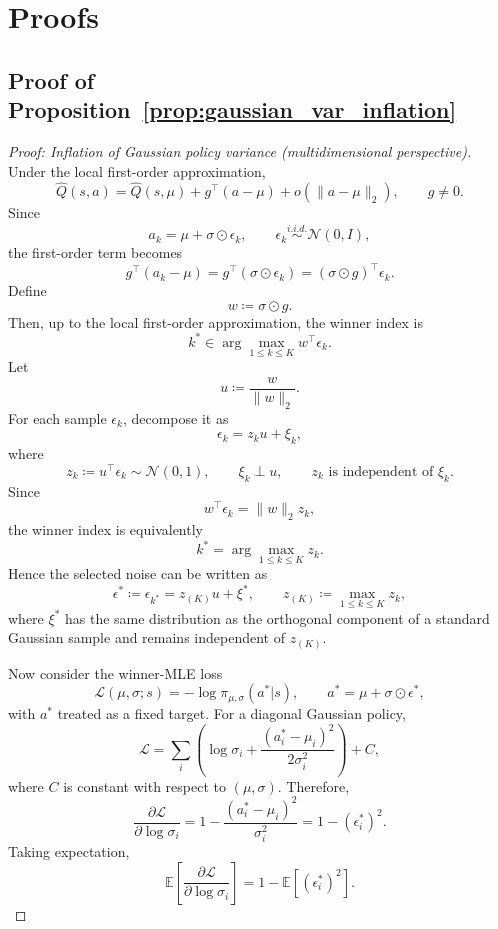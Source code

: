 \section{Proofs}
\subsection{Proof of Proposition~\ref{prop:gaussian_var_inflation}}
\label{app:proof_of_var_inflation_multi_dim}
\begin{proof}[Proof: Inflation of Gaussian policy variance (multidimensional perspective)]

Under the local first-order approximation,
\[
\hat Q(s,a)=\hat Q(s,\mu)+g^\top(a-\mu)+o(\|a-\mu\|_2),
\qquad g\neq 0.
\]
Since
\[
a_k=\mu+\sigma\odot \epsilon_k,
\qquad
\epsilon_k\overset{i.i.d.}{\sim}\mathcal N(0,I),
\]
the first-order term becomes
\[
g^\top(a_k-\mu)
=
g^\top(\sigma\odot \epsilon_k)
=
(\sigma\odot g)^\top \epsilon_k.
\]
Define
\[
w\coloneq \sigma\odot g.
\]
Then, up to the local first-order approximation, the winner index is
\[
k^*\in \arg\max_{1\le k\le K} w^\top \epsilon_k.
\]
Let
\[
u\coloneq \frac{w}{\|w\|_2}.
\]
For each sample $\epsilon_k$, decompose it as
\[
\epsilon_k=z_k u+\xi_k,
\]
where
\[
z_k\coloneq u^\top \epsilon_k \sim \mathcal N(0,1),
\qquad
\xi_k \perp u,
\qquad
z_k \text{ is independent of } \xi_k.
\]
Since
\[
w^\top \epsilon_k = \|w\|_2 z_k,
\]
the winner index is equivalently
\[
k^*=\arg\max_{1\le k\le K} z_k.
\]
Hence the selected noise can be written as
\[
\epsilon^* \coloneq \epsilon_{k^*}= z_{(K)}u+\xi^*,
\qquad
z_{(K)}\coloneq \max_{1\le k\le K} z_k,
\]
where $\xi^*$ has the same distribution as the orthogonal component of a standard Gaussian sample and remains independent of $z_{(K)}$.

Now consider the winner-MLE loss
\[
\mathcal L(\mu,\sigma;s)=-\log \pi_{\mu,\sigma}(a^*|s),
\qquad
a^*=\mu+\sigma\odot \epsilon^*,
\]
with $a^*$ treated as a fixed target. For a diagonal Gaussian policy,
\[
\mathcal L
=
\sum_i \left(
\log \sigma_i + \frac{(a_i^*-\mu_i)^2}{2\sigma_i^2}
\right)+C,
\]
where $C$ is constant with respect to $(\mu,\sigma)$. Therefore,
\[
\frac{\partial \mathcal L}{\partial \log \sigma_i}
=
1-\frac{(a_i^*-\mu_i)^2}{\sigma_i^2}
=
1-(\epsilon_i^*)^2.
\]
Taking expectation,
\[
\mathbb E\!\left[\frac{\partial \mathcal L}{\partial \log \sigma_i}\right]
=
1-\mathbb E[(\epsilon_i^*)^2].
\]


\end{proof}
